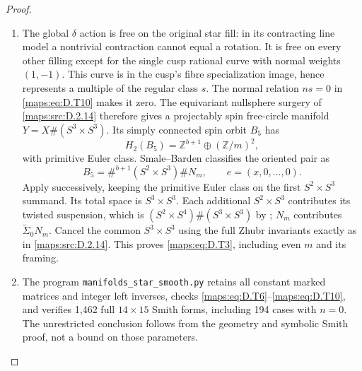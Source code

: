 \begin{proof}
\begin{enumerate}[label=\arabic*.,leftmargin=*]
\item The global $\delta$ action is free on the original star
fill: in its contracting line model a nontrivial contraction
cannot equal a rotation. It is free on every other filling
except for the single cusp rational curve with normal
weights $(1,-1)$. This curve is in the cusp's fibre
specialization image, hence represents a multiple of the
regular class $s$. The normal relation $ns=0$ in \eqref{maps:eq:D.T10}
makes it zero. The equivariant nullsphere surgery of \ref{maps:src:D.2.14}
therefore gives a projectably spin free-circle manifold
$Y=X\#(S^3\times S^3)$.
Its simply connected spin orbit $B_5$ has
\[
 H_2(B_5)=\mathbb Z^{b+1}\oplus(\mathbb Z/m)^2,
\]
with primitive Euler class. Smale--Barden classifies the
oriented pair as
\[
 B_5=\#^{b+1}(S^2\times S^3)\#N_m,
 \qquad e=(x,0,\ldots,0).
\]
Apply \cite[Theorem A]{manGR25} successively, keeping the
primitive Euler class on the first $S^2\times S^3$ summand.
Its total space is $S^3\times S^3$. Each additional
$S^2\times S^3$ contributes its twisted suspension, which
is $(S^2\times S^4)\#(S^3\times S^3)$ by
\cite[Theorem B(2)]{manGR25}; $N_m$ contributes
$\widetilde\Sigma_0N_m$. Cancel the common $S^3\times S^3$
using the full Zhubr invariants exactly as in \ref{maps:src:D.2.14}.
This proves \eqref{maps:eq:D.T3}, including even $m$ and its framing.

\item The program \texttt{manifolds\_star\_smooth.py} retains all
constant marked matrices and integer left inverses,
checks \eqref{maps:eq:D.T6}--\eqref{maps:eq:D.T10}, and verifies 1,462 full $14\times15$
Smith forms, including 194 cases with $n=0$. The unrestricted
conclusion follows from the geometry and symbolic Smith
proof, not a bound on those parameters.
\end{enumerate}
\end{proof}

